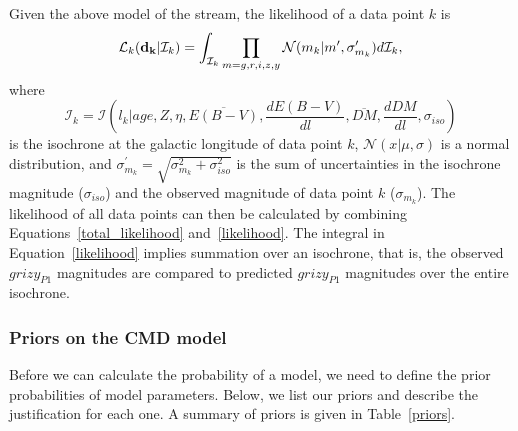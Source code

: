\documentclass[iop]{emulateapj}
\begin{document}
Given the above model of the stream, the likelihood of a data point $k$ is
\begin{equation}
    \mathcal{L}_k({\bf d_k} | \mathcal{I}_k) = \int_{\mathcal{I}_k} \prod_{m=g,r,i,z,y} \mathcal{N}(m_k | m^\prime, \sigma^\prime_{m_k})d\mathcal{I}_k, \label{likelihood}
\end{equation}
where
\begin{equation}
\mathcal{I}_k = \mathcal{I}(l_k | age, Z, \eta, \overline{E(B-V)}, \frac{dE(B-V)}{dl}, \overline{DM}, \frac{dDM}{dl}, \sigma_{iso})
\end{equation}
is the isochrone at the galactic longitude of data point $k$,
$\mathcal{N}(x|\mu,\sigma)$ is a normal distribution, and
$\sigma^\prime_{m_k}=\sqrt{\sigma_{m_k}^2 + \sigma_{iso}^2}$ is the sum of
uncertainties in the isochrone magnitude ($\sigma_{iso}$) and the observed
magnitude of data point $k$ ($\sigma_{m_k}$). The likelihood of all data points
can then be calculated by combining Equations~\ref{total_likelihood}
and~\ref{likelihood}. The integral in Equation~\ref{likelihood} implies
summation over an isochrone, that is, the observed $grizy_{P1}$ magnitudes are
compared to predicted $grizy_{P1}$ magnitudes over the entire isochrone.

\subsubsection{Priors\label{priors_section} on the CMD model}

Before we can calculate the probability of a model, we need to define the prior
probabilities of model parameters. Below, we list our priors and describe the
justification for each one. A summary of priors is given in Table~\ref{priors}.
\end{document}

